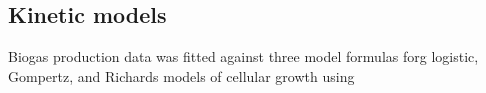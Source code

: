 \subsection{Kinetic models}
Biogas production data was fitted against three model formulas forg logistic, Gompertz, and
Richards models of cellular growth using  